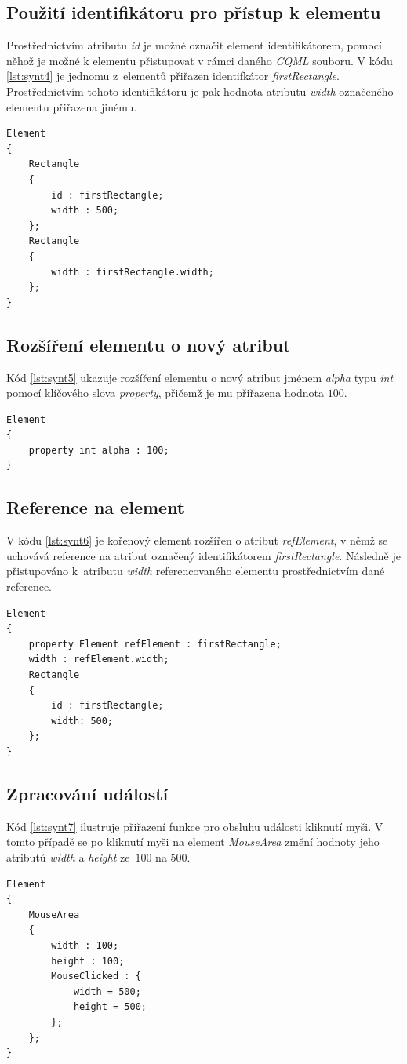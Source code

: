 \documentclass{article}
\begin{document}
\subsection{Použití identifikátoru pro přístup k elementu}
Prostřednictvím atributu \textit{id} je možné označit element identifikátorem, pomocí něhož je možné k elementu přistupovat v rámci daného \textit{CQML} souboru. V kódu \ref{lst:synt4} je jednomu z~elementů přiřazen identifkátor \textit{firstRectangle}. Prostřednictvím tohoto identifikátoru je pak hodnota atributu \textit{width} označeného elementu přiřazena jinému.
\begin{lstlisting}[float,frame=single,caption=Ukázka přístupu k elementu a jeho atributům pomocí identifikátoru.,label=lst:synt4]
Element
{
	Rectangle
	{
		id : firstRectangle;
		width : 500;
	};
	Rectangle
	{
		width : firstRectangle.width;
	};
}
\end{lstlisting}



\subsection{Rozšíření elementu o nový atribut}
Kód \ref{lst:synt5} ukazuje rozšíření elementu o nový atribut jménem \textit{alpha} typu \textit{int} pomocí klíčového slova \textit{property}, přičemž je mu přiřazena hodnota $100$.
\begin{lstlisting}[float,frame=single,caption=Syntaxe rozšíření elementu o nový atribut.,label=lst:synt5]
Element
{
	property int alpha : 100;
}
\end{lstlisting}


\subsection{Reference na element}
V kódu \ref{lst:synt6} je kořenový element rozšířen o atribut \textit{refElement}, v němž se uchovává reference na atribut označený identifikátorem \textit{firstRectangle}. Následně je přistupováno k~atributu \textit{width} referencovaného elementu prostřednictvím dané reference.
\begin{lstlisting}[float,frame=single,caption=Ukázka přístupu k atributům elementu pomocí reference.,label=lst:synt6]
Element
{
	property Element refElement : firstRectangle;
	width : refElement.width;
	Rectangle
	{
		id : firstRectangle;
		width: 500;
	};
}
\end{lstlisting}

\subsection{Zpracování událostí}
Kód \ref{lst:synt7} ilustruje přiřazení funkce pro obsluhu události kliknutí myši. V tomto případě se po kliknutí myši na element \textit{MouseArea} změní hodnoty jeho atributů \textit{width} a \textit{height} ze~$100$ na $500$.
\begin{lstlisting}[float,frame=single,caption=Syntaxe přiřazení funkce pro obsluhu události.,label=lst:synt7]
Element
{
	MouseArea
	{
		width : 100;
		height : 100;
		MouseClicked : {
			width = 500;
			height = 500;
		};
	};
}
\end{lstlisting}
\end{document}
